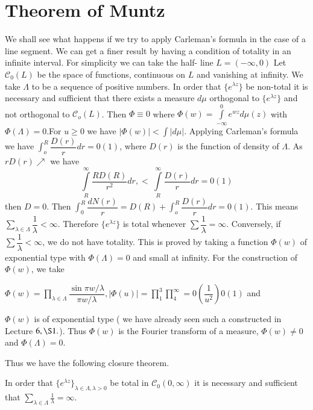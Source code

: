 \section{Theorem of Muntz}\label{chap11:sec4}%

We shall see what happens if we try to apply Carleman's formula in the
case of a line segment. We can get a finer result by having a
condition of totality in an infinite interval. For simplicity we can
take the half- line $L = (- \infty, 0)$ Let $\mathscr{C}_0(L)$ be the
space of functions, continuous on $L$ and vanishing at infinity. We
take $\Lambda$ to be a sequence of positive numbers. In order that
$\{e^{\lambda z} \}$ be non-total it is necessary and sufficient that
there exists a measure $d \mu$ orthogonal to $\{e^{\lambda z} \}$ and
not orthogonal to $\mathscr{C}_o(L)$. Then $\Phi \equiv 0$ where
$\Phi(w) = \int\limits^0_{-\infty} e^{wz} d\mu(z)$ with $\Phi (\Lambda) =
0$.For $u \ge 0$ we have $|\Phi (w)| < \int |d \mu|$. Applying
Carleman's formula we have $\int^R_o \dfrac{D(r)}{r} dr = 0(1)$, where
$D(r)$ is the function of density of $\Lambda$. As $rD(r)\nearrow$ we
have 
$$
\int\limits^{\infty}_R \frac{RD(R)}{r^2} dr, < ~\int\limits^\infty_R
\frac{D(r)}{r} dr = 0(1) 
$$
then $D = 0$. Then $\int^R_0 \dfrac{dN(r)}{r} = D(R) + \int^R_o
\dfrac{D(r)}{r}dr =0 (1)$. This means $\sum \limits_{\lambda \in
 \Lambda} \dfrac{1}{\lambda} < \infty$. Therefore $\{e^{\lambda z}
\}$ is total whenever $\sum \dfrac{1}{\lambda} = \infty$. Conversely,\pageoriginale
if $\sum \dfrac{1}{\lambda} < \infty$, we do not have totality. This
is proved by taking a function $\Phi(w)$ of exponential type with $\Phi
(\Lambda) = 0$ and small at infinity. For the construction of $\Phi
(w)$, we take 

 $\Phi (w) = 	\prod \limits_{\lambda \in \Lambda} \dfrac{\sin \pi w
 / \lambda}{\pi w/ \lambda}, |\Phi (u)| = \prod \limits^{3}_{1} \prod
\limits^{\infty}_4 = 0\left(\dfrac{1}{u^2}\right) 0 (1)$ and 
 
$\Phi(w)$ is of exponential type ( we have already seen such a
constructed in Lecture $6, \S 1.$). Thus $\Phi(w)$ is the Fourier
transform of a measure, $\Phi (w) \neq 0$ and $\Phi(\Lambda) = 0$. 

Thus we have the following closure theorem.

\begin{theorem*}%
  In order that $\{e^{\lambda z} \}_{\lambda \in \Lambda, \lambda >
    0}$ be total in $\mathscr{C}_0 (0, \infty)$ it is necessary and
  sufficient that $\sum \limits_{\lambda \in \Lambda}
  \frac{1}{\lambda} = \infty$. 
\end{theorem*}

